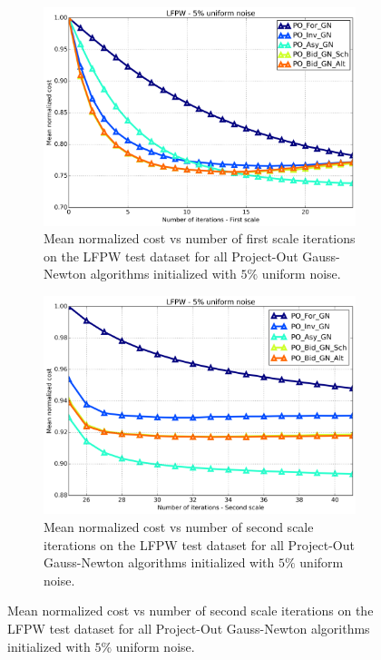 \begin{figure}[p]
\begin{subfigure}{0.48\textwidth}
	\end{subfigure}
	\par\bigskip\bigskip
	\begin{subfigure}{0.48\textwidth}
	    \includegraphics[width=\textwidth]{experiments/algorithms/po_gn/mean_cost_vs_iters1_po_gn_5.png}
	    \caption{Mean normalized cost vs number of first scale iterations on the LFPW test dataset for all Project-Out Gauss-Newton algorithms initialized with $5\%$ uniform noise.}
	    \label{fig:mean_cost_vs_iters1_po_gn_5}
	\end{subfigure}
	\hfill
	\begin{subfigure}{0.48\textwidth}
	    \includegraphics[width=\textwidth]{experiments/algorithms/po_gn/mean_cost_vs_iters2_po_gn_5.png}
	    \caption{Mean normalized cost vs number of second scale iterations on the LFPW test dataset for all Project-Out Gauss-Newton algorithms initialized with $5\%$ uniform noise.}

\end{subfigure}
\end{figure}
